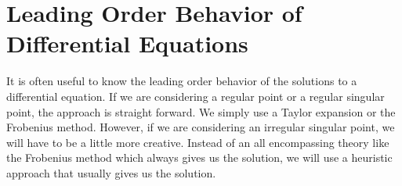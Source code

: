 \section{Leading Order Behavior of Differential Equations}

It is often useful to know the leading order behavior of the solutions
to a differential equation.  If we are considering a regular point
or a regular singular point, the approach is straight forward.  We simply
use a Taylor expansion or the Frobenius method.  However, if we are
considering an irregular singular point, we will have to be a little
more creative.  Instead of an all encompassing theory like the
Frobenius method which always gives us the solution, 
we will use a heuristic approach that usually gives us the solution.







